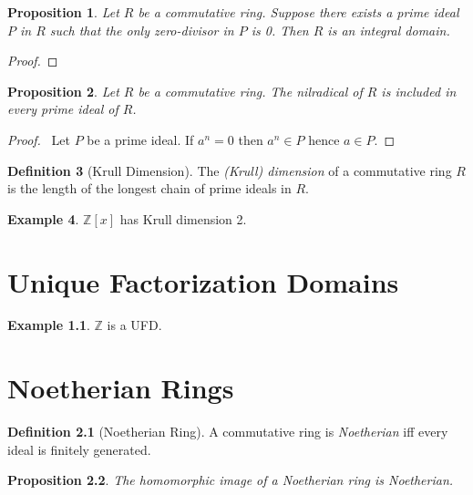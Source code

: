 \documentclass{book}
\let\qed\relax
\newtheorem{prop}{Proposition}[chapter]
\theoremstyle{definition}
\newtheorem{df}[prop]{Definition}
\newtheorem{ex}[prop]{Example}
\begin{document}
\begin{prop}
Let $R$ be a commutative ring. Suppose there exists a prime ideal $P$ in $R$ such that the only zero-divisor in $P$ is 0. Then $R$ is an integral domain.
\end{prop}

\begin{proof}
\pf
{}
\qed
\end{proof}

\begin{prop}
Let $R$ be a commutative ring. The nilradical of $R$ is included in every prime ideal of $R$.
\end{prop}

\begin{proof}
\pf\ Let $P$ be a prime ideal. If $a^n = 0$ then $a^n \in P$ hence $a \in P$. \qed
\end{proof}


\begin{df}[Krull Dimension]
The \emph{(Krull) dimension} of a commutative ring $R$ is the length of the longest chain of prime ideals in $R$.
\end{df}

\begin{ex}
$\mathbb{Z}[x]$ has Krull dimension 2. %
\end{ex}

\chapter{Unique Factorization Domains}


\begin{ex}
$\mathbb{Z}$ is a UFD.
\end{ex}

\chapter{Noetherian Rings}

\begin{df}[Noetherian Ring]
A commutative ring is \emph{Noetherian} iff every ideal is finitely generated.
\end{df}

\begin{prop}
The homomorphic image of a Noetherian ring is Noetherian.
\end{prop}
\end{document}

